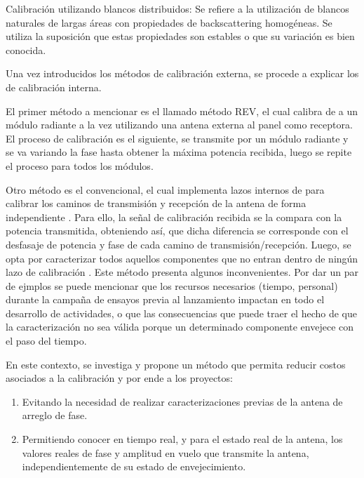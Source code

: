 Calibración utilizando blancos distribuidos: Se refiere a la utilización de blancos naturales de largas áreas con 
propiedades de backscattering homogéneas. Se utiliza la suposición que estas propiedades son estables o que su variación es 
bien conocida.

Una vez introducidos los métodos de calibración externa, se procede a explicar los de calibración interna.

El primer método a mencionar es el llamado método REV, el cual calibra de a un módulo radiante a la vez utilizando una 
antena externa al panel como receptora. El proceso de calibración es el siguiente, se transmite por un módulo radiante
y se va variando la fase hasta obtener la máxima potencia recibida, luego se repite el proceso para todos los módulos. 

Otro método es el convencional, el cual implementa lazos internos de para calibrar los caminos de transmisión y 
recepción de la antena de forma independiente \cite{Makhoul2012}\cite{Luscombe1990}\cite{Seifert1996}\cite{Dall1994}
\cite{Freeman1995}\cite{Bibby2003}\cite{Bast2003}\cite{Stove2004}\cite{Srivastava1996}\cite{Wang2010}.
Para ello, la señal de calibración recibida se la compara con la potencia transmitida, obteniendo así, que dicha diferencia 
se corresponde con el desfasaje de potencia y fase de cada camino de transmisión/recepción. Luego, se opta por caracterizar 
todos aquellos componentes que no entran dentro de ningún lazo de calibración \cite{Freeman1995}. Este método presenta 
algunos inconvenientes. Por dar un par de ejmplos se puede mencionar que los recursos necesarios (tiempo, personal) durante 
la campaña de ensayos previa al lanzamiento impactan en todo el desarrollo de actividades, o que las consecuencias que puede 
traer el hecho de que la caracterización no sea válida porque un determinado componente envejece con el paso del tiempo.

En este contexto, se investiga y propone un método que permita reducir costos 
asociados a la calibración y por ende a los proyectos:

\begin{enumerate}
    \item Evitando la necesidad de realizar caracterizaciones previas de la antena de arreglo de fase.
    \item Permitiendo conocer en tiempo real, y para el estado real de la antena, los valores reales de fase y amplitud en 
		vuelo que transmite la antena, independientemente de su estado de envejecimiento.
\end{enumerate}

